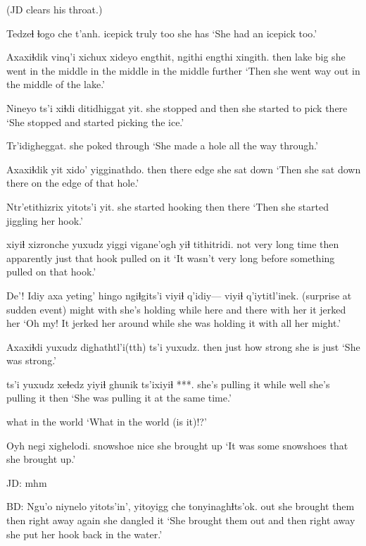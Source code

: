 \documentclass[12pt]{article}
\begin{document}
(JD clears his throat.)

\gll Tedzeɬ ɬogo che t'anh.
icepick truly too {she has}
\glt `She had an icepick too.'
\glend

\gll Axaxiɬdik vinq'i xichux xideyo engthit, ngithi engthi xingith.
then   lake   big    {she went} {in the middle} {in the middle} {in the middle} further
\glt `Then she went way out in the middle of the lake.'
\glend

\gll Nineyo ts'i xiɬdi ditidhiggat yit.
{she stopped} and then {she started to pick} there
\glt `She stopped and started picking the ice.'
\glend

\gll Tr'idigheggat.
{{she poked through}}
\glt `She made a hole all the way through.'
\glend

\gll Axaxiɬdik yit xido' yigginathdo.
then   there edge {she sat down}
\glt `Then she sat down there on the edge of that hole.'
\glend

\gll Ntr'etithizrix yitots'i yit.
{she started hooking} then there
\glt `Then she started jiggling her hook.'
\glend

 xiyiɬ xizronche yuxudz yiggi vigane'ogh {yiɬ tithitridi}.
{not very long time}           then apparently just that hook     {pulled on it}
\glt `It wasn't very long before something pulled on that hook.'
\glend

\gll De'! Idiy axa yeting' hingo ngiɬgits'i {viyiɬ q'idiy---} viyiɬ q'iytitl'inek.
{(surprise at sudden event)} might with {she's holding} while {here and there}   {}  {with her}   {it jerked her} 
\glt `Oh my! It jerked her around while she was holding it with all her might.'
\glend

\gll Axaxiɬdi yuxudz dighathtl'i(tth) ts'i  yuxudz.
then just {how strong she is} {} just
\glt `She was strong.'
\glend 

 ts'i yuxudz xeɬedz {yiyiɬ ghunik} ts'ixiyiɬ ***.
{she's pulling it} while {} well  {she's pulling it} then 
\glt `She was pulling it at the same time.'
\glend

{{what in the world}}
\glt `What in the world (is it)!?'
\glend

\gll Oyh negi xighelodi.
snowshoe nice {she brought up}
\glt `It was some snowshoes that she brought up.'
\glend

JD:  mhm

BD:  
\gll Ngu'o niynelo yitots'in', yitoyigg che tonyinaghɬts'ok.
out   {she brought them} then {right away} again {she dangled it}
\glt `She brought them out and then right away she put her hook back in the water.'
\glend
\end{document}
